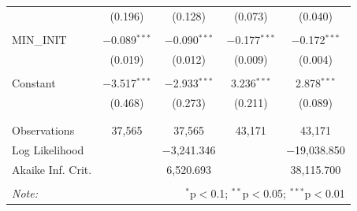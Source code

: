 \begin{tabular}{@{\extracolsep{5pt}}lcccc}
  & (0.196) & (0.128) & (0.073) & (0.040) \\ 
  & & & & \\ 
 MIN\_INIT & $-$0.089$^{***}$ & $-$0.090$^{***}$ & $-$0.177$^{***}$ & $-$0.172$^{***}$ \\ 
  & (0.019) & (0.012) & (0.009) & (0.004) \\ 
  & & & & \\ 
 Constant & $-$3.517$^{***}$ & $-$2.933$^{***}$ & 3.236$^{***}$ & 2.878$^{***}$ \\ 
  & (0.468) & (0.273) & (0.211) & (0.089) \\ 
  & & & & \\ 
\hline \\[-1.8ex] 
Observations & 37,565 & 37,565 & 43,171 & 43,171 \\ 
Log Likelihood &  & $-$3,241.346 &  & $-$19,038.850 \\ 
Akaike Inf. Crit. &  & 6,520.693 &  & 38,115.700 \\ 
\hline 
\hline \\[-1.8ex] 
\textit{Note:}  & \multicolumn{4}{r}{$^{*}$p$<$0.1; $^{**}$p$<$0.05; $^{***}$p$<$0.01} \\ 
\end{tabular} 
